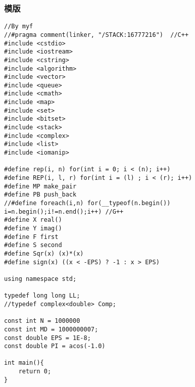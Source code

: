 \subsubsection{模版}
\begin{verbatim}
//By myf
//#pragma comment(linker, "/STACK:16777216")  //C++
#include <cstdio>
#include <iostream>
#include <cstring>
#include <algorithm>
#include <vector>
#include <queue>
#include <cmath>
#include <map>
#include <set>
#include <bitset>
#include <stack>
#include <complex>
#include <list>
#include <iomanip>

#define rep(i, n) for(int i = 0; i < (n); i++)
#define REP(i, l, r) for(int i = (l) ; i < (r); i++)
#define MP make_pair
#define PB push_back
//#define foreach(i,n) for(__typeof(n.begin()) i=n.begin();i!=n.end();i++) //G++
#define X real()
#define Y imag()
#define F first
#define S second
#define Sqr(x) (x)*(x)
#define sign(x) ((x < -EPS) ? -1 : x > EPS)

using namespace std;

typedef long long LL;
//typedef complex<double> Comp;

const int N = 1000000
const int MD = 1000000007;
const double EPS = 1E-8;
const double PI = acos(-1.0)

int main(){
    return 0;
}
\end{verbatim}
